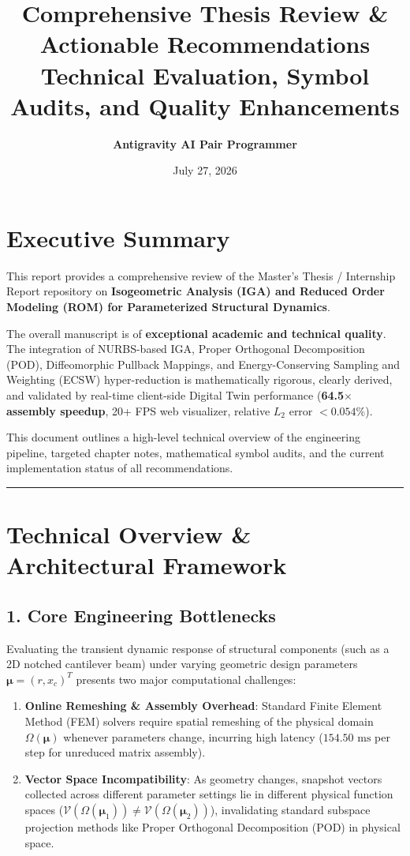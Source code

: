 \documentclass[11pt,a4paper]{article}
\title{\textbf{\Large Comprehensive Thesis Review \& Actionable Recommendations}\\[0.3em]
\large Technical Evaluation, Symbol Audits, and Quality Enhancements}
\author{\textbf{Antigravity AI Pair Programmer}}
\date{July 27, 2026}
\begin{document}
\maketitle

\section*{Executive Summary}
This report provides a comprehensive review of the Master's Thesis / Internship Report repository on \textbf{Isogeometric Analysis (IGA) and Reduced Order Modeling (ROM) for Parameterized Structural Dynamics}. 

The overall manuscript is of \textbf{exceptional academic and technical quality}. The integration of NURBS-based IGA, Proper Orthogonal Decomposition (POD), Diffeomorphic Pullback Mappings, and Energy-Conserving Sampling and Weighting (ECSW) hyper-reduction is mathematically rigorous, clearly derived, and validated by real-time client-side Digital Twin performance (\textbf{64.5$\times$ assembly speedup}, 20+ FPS web visualizer, relative $L_2$ error $< 0.054\%$).

This document outlines a high-level technical overview of the engineering pipeline, targeted chapter notes, mathematical symbol audits, and the current implementation status of all recommendations.

\vspace{0.5em}
\hrule
\vspace{1em}

\section{Technical Overview \& Architectural Framework}

\subsection*{1. Core Engineering Bottlenecks}
Evaluating the transient dynamic response of structural components (such as a 2D notched cantilever beam) under varying geometric design parameters $\boldsymbol{\mu} = (r, x_c)^T$ presents two major computational challenges:
\begin{enumerate}
    \item \textbf{Online Remeshing \& Assembly Overhead}: Standard Finite Element Method (FEM) solvers require spatial remeshing of the physical domain $\Omega(\boldsymbol{\mu})$ whenever parameters change, incurring high latency ($154.50\text{ ms}$ per step for unreduced matrix assembly).
    \item \textbf{Vector Space Incompatibility}: As geometry changes, snapshot vectors collected across different parameter settings lie in different physical function spaces ($\mathcal{V}(\Omega(\boldsymbol{\mu}_1)) \neq \mathcal{V}(\Omega(\boldsymbol{\mu}_2))$), invalidating standard subspace projection methods like Proper Orthogonal Decomposition (POD) in physical space.
\end{enumerate}
\end{document}
